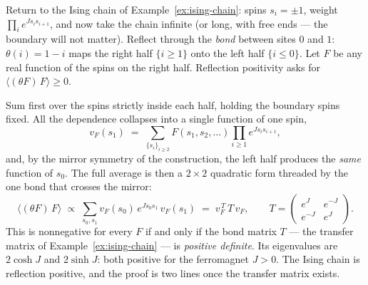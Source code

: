 \begin{eexample}
\label{ex:lattice-rp}
Return to the Ising chain of Example~\ref{ex:ising-chain}: spins $s_i = \pm1$,
weight $\prod_i e^{J s_i s_{i+1}}$, and now take the chain infinite (or long,
with free ends --- the boundary will not matter). Reflect through the
\emph{bond} between sites $0$ and $1$: $\theta(i) = 1 - i$ maps the right half
$\{i \ge 1\}$ onto the left half $\{i \le 0\}$. Let $F$ be any real function of
the spins on the right half. Reflection positivity asks for $\langle
(\theta F)\, F\rangle \ge 0$.

Sum first over the spins strictly inside each half, holding the boundary spins
fixed. All the dependence collapses into a single function of one spin,
\begin{equation}
v_F(s_1) \;=\; \sum_{\{s_i\}_{i \ge 2}} F(s_1, s_2, \dots)
\prod_{i \ge 1} e^{J s_i s_{i+1}},
\end{equation}
and, by the mirror symmetry of the construction, the left half produces the
\emph{same} function of $s_0$. The full average is then a $2\times2$ quadratic
form threaded by the one bond that crosses the mirror:
\begin{equation}
\langle (\theta F)\, F \rangle \;\propto\; \sum_{s_0, s_1}
v_F(s_0) \, e^{J s_0 s_1} \, v_F(s_1)
\;=\; v_F^{\,T}\, T \, v_F ,
\qquad
T = \begin{pmatrix} e^J & e^{-J} \\ e^{-J} & e^{J}\end{pmatrix}.
\label{eq:rp-transfer}
\end{equation}
This is nonnegative for every $F$ if and only if the bond matrix $T$ ---
the transfer matrix of Example~\ref{ex:ising-chain} --- is \emph{positive
definite}. Its eigenvalues are $2\cosh J$ and $2\sinh J$: both positive for
the ferromagnet $J > 0$. The Ising chain is reflection positive, and the proof
is two lines once the transfer matrix exists.


\end{eexample}

